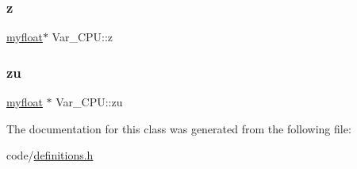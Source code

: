 \mbox{\label{classVar__CPU_a0bf380785a4e55378dbae25cd0122857}} 
\subsubsection{\texorpdfstring{z}{z}}
{\footnotesize\ttfamily \hyperlink{param_8h_a5f097c9f3873af7be7fc156e6a06ca5e}{myfloat}$\ast$ Var\+\_\+\+C\+P\+U\+::z}

\mbox{\label{classVar__CPU_abbec398f5de4be1a5b3f6a9a0ffba982}} 
\subsubsection{\texorpdfstring{zu}{zu}}
{\footnotesize\ttfamily \hyperlink{param_8h_a5f097c9f3873af7be7fc156e6a06ca5e}{myfloat} $\ast$ Var\+\_\+\+C\+P\+U\+::zu}



The documentation for this class was generated from the following file\+:\begin{DoxyCompactItemize}
\item 
code/\hyperlink{definitions_8h}{definitions.\+h}\end{DoxyCompactItemize}
